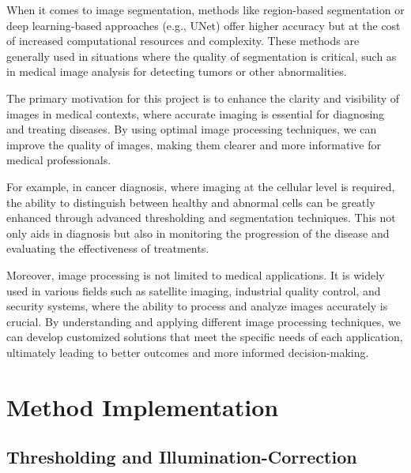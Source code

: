 \documentclass[%
	a4paper, %
	12pt, %
	english, %
	bibtotoc %
]{scrartcl}
\newcommand{\todo}[1]{{\color{blue}{TODO: {#1}}}}
\begin{document}
When it comes to image segmentation, methods like region-based segmentation or deep learning-based approaches (e.g., UNet) offer higher accuracy but at the cost of increased computational resources and complexity. These methods are generally used in situations where the quality of segmentation is critical, such as in medical image analysis for detecting tumors or other abnormalities.


The primary motivation for this project is to enhance the clarity and visibility of images in medical contexts, where accurate imaging is essential for diagnosing and treating diseases. By using optimal image processing techniques, we can improve the quality of images, making them clearer and more informative for medical professionals.

For example, in cancer diagnosis, where imaging at the cellular level is required, the ability to distinguish between healthy and abnormal cells can be greatly enhanced through advanced thresholding and segmentation techniques. This not only aids in diagnosis but also in monitoring the progression of the disease and evaluating the effectiveness of treatments.

Moreover, image processing is not limited to medical applications. It is widely used in various fields such as satellite imaging, industrial quality control, and security systems, where the ability to process and analyze images accurately is crucial. By understanding and applying different image processing techniques, we can develop customized solutions that meet the specific needs of each application, ultimately leading to better outcomes and more informed decision-making.


\section{Method Implementation}
\subsection{Thresholding and Illumination-Correction}
\end{document}
